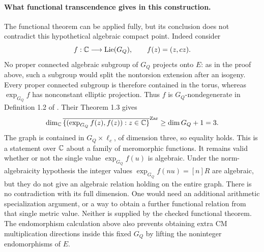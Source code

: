 \paragraph{What functional transcendence gives in this construction.}
The functional theorem can be applied fully, but its conclusion
does not contradict this hypothetical algebraic compact point.
Indeed consider
\[
 f:\mathbb C\longrightarrow\operatorname{Lie}(G_Q),\qquad
 f(z)=(z,cz).
\]
No proper connected algebraic subgroup of $G_Q$ projects
onto $E$: as in the proof above, such a subgroup would split
the nontorsion extension after an isogeny. Every proper
connected subgroup is therefore contained in the torus,
whereas $\exp_{G_Q}f$ has nonconstant elliptic projection.
Thus $f$ is $G_Q$-nondegenerate in Definition 1.2 of
\citet{noguchi2024}. Their Theorem 1.3 gives
\[
 \dim_{\mathbb C}\overline{\{(\exp_{G_Q}f(z),f(z)):z\in\mathbb C\}}^{\rm Zar}
       \ge \dim G_Q+1=3.
\]
The graph is contained in $G_Q\times\ell_c$, of dimension
three, so equality holds. This is a statement over $\mathbb C$
about a family of meromorphic functions. It remains valid
whether or not the single value $\exp_{G_Q}f(u)$ is
algebraic. Under the norm-algebraicity hypothesis the integer
values $\exp_{G_Q}f(nu)=[n]R$ are algebraic, but they do
not give an algebraic relation holding on the entire graph.
There is no contradiction with its full dimension.
One would need an additional arithmetic specialization
argument, or a way to obtain a further functional relation
from that single metric value. Neither is supplied by the
checked functional theorem. The endomorphism calculation
above also prevents obtaining extra CM multiplication
directions inside this fixed $G_Q$ by lifting the
noninteger endomorphisms of $E$.
